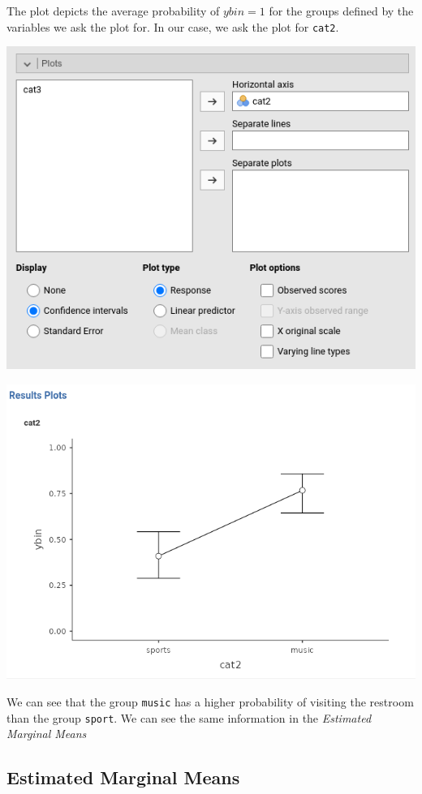 \documentclass[
]{book}
\begin{document}
The plot depicts the average probability of \(ybin=1\) for the groups defined by the variables we ask the plot for. In our case, we ask the plot for \texttt{cat2}.

\includegraphics{bookletpics/3_logistic_input6.png}

\includegraphics{bookletpics/3_logistic_plot4.png}

We can see that the group \texttt{music} has a higher probability of visiting the restroom than the group \texttt{sport}. We can see the same information in the \emph{Estimated Marginal Means}

\hypertarget{estimated-marginal-means-1}{%
\subsection{Estimated Marginal Means}\label{estimated-marginal-means-1}}
\end{document}
